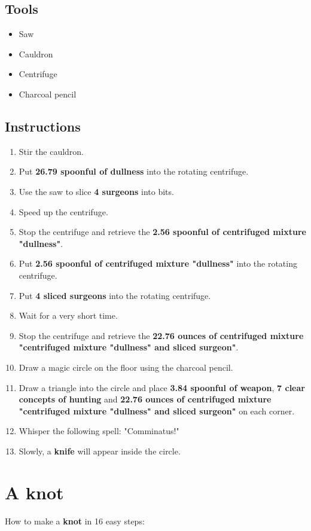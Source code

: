 \documentclass{article}
\begin{document}
\subsection{Tools}\begin{itemize}
\item 
Saw
\item 
Cauldron
\item 
Centrifuge
\item 
Charcoal pencil
\end{itemize}
\subsection{Instructions}\begin{enumerate}
\item 
Stir the cauldron.
\item 
Put \textbf{26.79 spoonful of dullness} into the rotating centrifuge.
\item 
Use the saw to slice \textbf{4 surgeons} into bits.
\item 
Speed up the centrifuge.
\item 
Stop the centrifuge and retrieve the \textbf{2.56 spoonful of centrifuged mixture "dullness"}.
\item 
Put \textbf{2.56 spoonful of centrifuged mixture "dullness"} into the rotating centrifuge.
\item 
Put \textbf{4 sliced surgeons} into the rotating centrifuge.
\item 
Wait for a very short time.
\item 
Stop the centrifuge and retrieve the \textbf{22.76 ounces of centrifuged mixture "centrifuged mixture "dullness" and sliced surgeon"}.
\item 
Draw a magic circle on the floor using the charcoal pencil.
\item 
Draw a triangle into the circle and place \textbf{3.84 spoonful of weapon}, \textbf{7 clear concepts of hunting} and \textbf{22.76 ounces of centrifuged mixture "centrifuged mixture "dullness" and sliced surgeon"} on each corner.
\item 
Whisper the following spell: "Comminatus!"
\item 
Slowly, a \textbf{knife} will appear inside the circle.
\end{enumerate}
\newpage
\section{A knot}How to make a \textbf{knot} in 16 easy steps:
\end{document}

